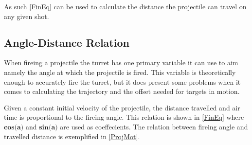 As such \autoref{FinEq} can be used to calculate the distance the projectile can
travel on any given shot.

\subsection{Angle-Distance Relation}
When fireing a projectile the turret has one primary variable it can use to aim
namely the angle at which the projectile is fired. This variable is
theoretically enough to accurately fire the turret, but it does present some
problems when it comes to calculating the trajectory and the offset needed for
targets in motion.\nl

Given a constant initial velocity of the projectile, the distance travelled and
air time is proportional to the fireing angle. This relation is shown in
\autoref{FinEq} where $\textbf{cos(a)}$ and $\textbf{sin(a)}$ are used as
coeffecients. The relation between fireing angle and travelled distance is
exemplified in \autoref{ProjMot}.




% 

